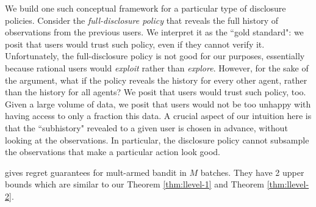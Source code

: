 We build one such conceptual framework for a particular type of disclosure policies. Consider the \emph{full-disclosure policy} that reveals the full history of observations from the previous users. We interpret it as the ``gold standard": we posit that users would trust such policy, even if they cannot verify it. Unfortunately, the full-disclosure policy is not good for our purposes, essentially because rational users would \emph{exploit} rather than \emph{explore}. However, for the sake of the argument, what if the policy reveals the history for every other agent, rather than the history for all agents? We posit that users would trust such policy, too. Given a large volume of data, we posit that users would not be too unhappy with having access to only a fraction this data. A crucial aspect of our intuition here is that the ``subhistory" revealed to a given user is chosen in advance, without looking at the observations. In particular, the disclosure policy cannot subsample the observations that make a particular action look good.








\cite{Perchet2015BatchedBP} gives regret guarantees for mult-armed bandit in $M$ batches. They have 2 upper bounds which are similar to our Theorem \ref{thm:llevel-1} and Theorem \ref{thm:llevel-2}.
